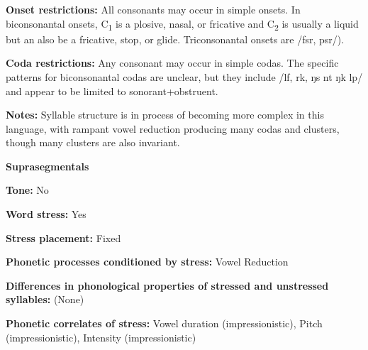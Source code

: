 \begin{styleBody}
\textbf{Onset restrictions: }All consonants may occur in simple onsets. In biconsonantal onsets, C\textsubscript{1} is a plosive, nasal, or fricative and C\textsubscript{2} is usually a liquid but an also be a fricative, stop, or glide. Triconsonantal onsets are /fsr, psr/).
\end{styleBody}

\begin{styleBody}
\textbf{Coda restrictions: }Any consonant may occur in simple codas. The specific patterns for biconsonantal codas are unclear, but they include /lf, rk, ŋs nt ŋk lp/ and appear to be limited to sonorant+obstruent.
\end{styleBody}

\begin{styleBody}
\textbf{Notes: }Syllable structure is in process of becoming more complex in this language, with rampant vowel reduction producing many codas and clusters, though many clusters are also invariant.
\end{styleBody}

\begin{styleBody}
\textbf{Suprasegmentals}
\end{styleBody}

\begin{styleBody}
\textbf{Tone:} No
\end{styleBody}

\begin{styleBody}
\textbf{Word stress:} Yes
\end{styleBody}

\begin{styleBody}
\textbf{Stress placement:} Fixed
\end{styleBody}

\begin{styleBody}
\textbf{Phonetic processes conditioned by stress:} Vowel Reduction
\end{styleBody}

\begin{styleBody}
\textbf{Differences in phonological properties of stressed and unstressed syllables:} (None)
\end{styleBody}

\begin{styleBody}
\textbf{Phonetic correlates of stress: }Vowel duration (impressionistic), Pitch (impressionistic), Intensity (impressionistic)
\end{styleBody}

